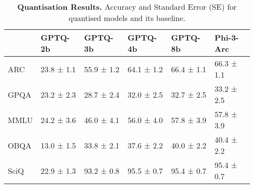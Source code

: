 
\begin{table}[H]
\centering
\caption{\textbf{Quantisation Results.} Accuracy and Standard Error (SE) for quantised models and its baseline.}
\label{tab:quantised-benchmark}
\begin{tabular}{llllll}
\toprule
 & GPTQ-2b & GPTQ-3b & GPTQ-4b & GPTQ-8b & Phi-3-Arc \\
\midrule
ARC & 23.8 ± 1.1 & 55.9 ± 1.2 & 64.1 ± 1.2 & 66.4 ± 1.1 & 66.3 ± 1.1 \\
GPQA & 23.2 ± 2.3 & 28.7 ± 2.4 & 32.0 ± 2.5 & 32.7 ± 2.5 & 33.2 ± 2.5 \\
MMLU & 24.2 ± 3.6 & 46.0 ± 4.1 & 56.0 ± 4.0 & 57.8 ± 3.9 & 57.8 ± 3.9 \\
OBQA & 13.0 ± 1.5 & 33.8 ± 2.1 & 37.6 ± 2.2 & 40.0 ± 2.2 & 40.4 ± 2.2 \\
SciQ & 22.9 ± 1.3 & 93.2 ± 0.8 & 95.5 ± 0.7 & 95.4 ± 0.7 & 95.4 ± 0.7 \\
\bottomrule
\end{tabular}
\end{table}
